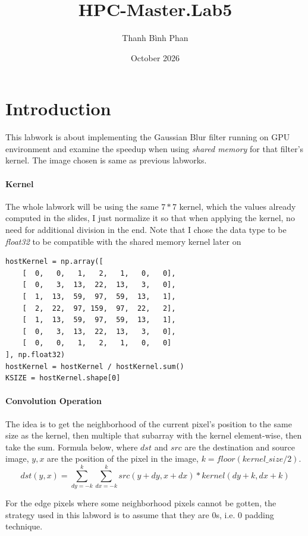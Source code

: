\documentclass{article}
\title{HPC-Master.Lab5}
\author{Thanh Bình Phan}
\date{October 2026}
\begin{document}
\maketitle

\section{Introduction}
This labwork is about implementing the Gaussian Blur filter running on GPU environment and examine the speedup when using \textit{shared memory} for that filter's kernel.
The image chosen is same as previous labworks.
\paragraph{Kernel} The whole labwork will be using the same $7*7$ kernel, which the values already computed in the slides, I just normalize it so that when applying the kernel, no need for additional division in the end. Note that I chose the data type to be \textit{float32} to be compatible with the shared memory kernel later on
\begin{verbatim}
hostKernel = np.array([
    [  0,   0,   1,   2,   1,   0,   0],
    [  0,   3,  13,  22,  13,   3,   0],
    [  1,  13,  59,  97,  59,  13,   1],
    [  2,  22,  97, 159,  97,  22,   2],
    [  1,  13,  59,  97,  59,  13,   1],
    [  0,   3,  13,  22,  13,   3,   0],
    [  0,   0,   1,   2,   1,   0,   0]
], np.float32)
hostKernel = hostKernel / hostKernel.sum()
KSIZE = hostKernel.shape[0]
\end{verbatim}

\paragraph{Convolution Operation} The idea is to get the neighborhood of the current pixel's position to the same size as the kernel, then multiple that subarray with the kernel element-wise, then take the sum. Formula below, where $dst$ and $src$ are the destination and source image, $y,x$ are the position of the pixel in the image, $k = floor(kernel\_size / 2)$.
\[
dst(y,x) = \sum_{dy=-k}^{k} \sum_{dx=-k}^k src(y+dy,x+dx) * kernel(dy+k, dx+k)
\]

For the edge pixels where some neighborhood pixels cannot be gotten, the strategy used in this labword is to assume that they are 0s, i.e. 0 padding technique.
\end{document}
